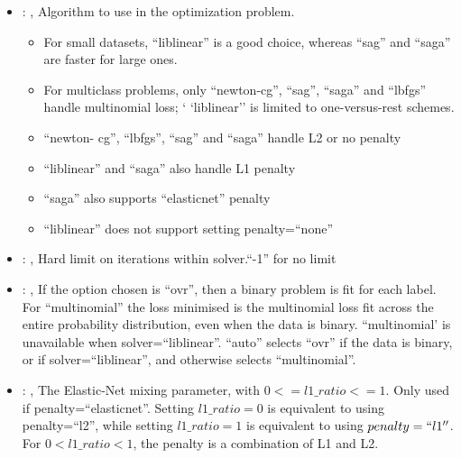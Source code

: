 \begin{itemize}
    \item {}: , 
      Algorithm to use in the optimization problem.
      \begin{itemize}                                                    \item For small datasets,
      ``liblinear'' is a good choice, whereas ``sag'' and ``saga'' are faster for large ones.
      \item For multiclass problems, only ``newton-cg'', ``sag'', ``saga'' and ``lbfgs'' handle
      multinomial loss; `                                                    `liblinear'' is limited
      to one-versus-rest schemes.                                                    \item ``newton-
      cg'', ``lbfgs'', ``sag'' and ``saga'' handle L2 or no penalty
      \item ``liblinear'' and ``saga'' also handle L1 penalty
      \item ``saga'' also supports ``elasticnet'' penalty
      \item ``liblinear'' does not support setting penalty=``none''
      \end{itemize}

    \item {}: , 
      Hard limit on iterations within solver.``-1'' for no limit

    \item {}: , 
      If the option chosen is ``ovr'', then a binary problem is fit for each label. For
      ``multinomial''                                                  the loss minimised is the
      multinomial loss fit across the entire probability distribution, even when the
      data is binary. ``multinomial' is unavailable when solver=``liblinear''. ``auto'' selects
      ``ovr'' if the data is                                                  binary, or if
      solver=``liblinear'', and otherwise selects ``multinomial''.

    \item {}: , 
      The Elastic-Net mixing parameter, with $0 <= l1\_ratio <= 1$. Only used if
      penalty=``elasticnet''.                                                  Setting $l1\_ratio=0$
      is equivalent to using penalty=``l2'', while setting $l1\_ratio=1$ is equivalent to using
      $penalty=``l1''$. For $0 < l1\_ratio <1$, the penalty is a combination of L1 and L2.


\end{itemize}
